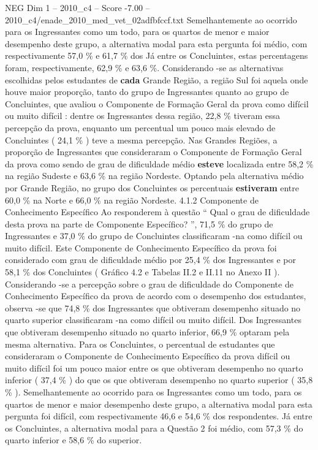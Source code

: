 \begin{textsample}{NEG Dim 1 – 2010\_c4 – Score -7.00 – 2010\_c4/enade\_2010\_med\_vet\_02adfbfccf.txt}
Semelhantemente ao ocorrido para os Ingressantes como um todo, para os quartos de menor e maior desempenho deste grupo, a alternativa modal para esta pergunta foi médio, com respectivamente 57,0 \% e 61,7 \% dos Já entre os Concluintes, estas percentagens foram, respectivamente, 62,9 \% e 63,6 \%.
Considerando -se as alternativas escolhidas pelos estudantes de \textbf{cada} Grande Região, a região Sul foi aquela onde houve maior proporção, tanto do grupo de Ingressantes quanto ao grupo de Concluintes, que avaliou o Componente de Formação Geral da prova como difícil ou muito difícil : dentre os Ingressantes dessa região, 22,8 \% tiveram essa percepção da prova, enquanto um percentual um pouco mais elevado de Concluintes ( 24,1 \% ) teve a mesma percepção.
Nas Grandes Regiões, a proporção de Ingressantes que consideraram o Componente de Formação Geral da prova como sendo de grau de dificuldade médio \textbf{esteve} localizada entre 58,2 \% na região Sudeste e 63,6 \% na região Nordeste.
Optando pela alternativa médio por Grande Região, no grupo dos Concluintes os percentuais \textbf{estiveram} entre 60,0 \% na Norte e 66,0 \% na região Nordeste. 4.1.2 Componente de Conhecimento Específico Ao responderem à questão “ Qual o grau de dificuldade desta prova na parte de Componente Específico? ”, 71,5 \% do grupo de Ingressantes e 37,0 \% do grupo de Concluintes classificaram -na como difícil ou muito difícil.
Este Componente de Conhecimento Específico da prova foi considerado com grau de dificuldade médio por 25,4 \% dos Ingressantes e por 58,1 \% dos Concluintes ( Gráfico 4.2 e Tabelas II.2 e II.11 no Anexo II ).
Considerando -se a percepção sobre o grau de dificuldade do Componente de Conhecimento Específico da prova de acordo com o desempenho dos estudantes, observa -se que 74,8 \% dos Ingressantes que obtiveram desempenho situado no quarto superior classificaram -na como difícil ou muito difícil.
Dos Ingressantes que obtiveram desempenho situado no quarto inferior, 66,9 \% optaram pela mesma alternativa.
Para os Concluintes, o percentual de estudantes que consideraram o Componente de Conhecimento Específico da prova difícil ou muito difícil foi um pouco maior entre os que obtiveram desempenho no quarto inferior ( 37,4 \% ) do que os que obtiveram desempenho no quarto superior ( 35,8 \% ).
Semelhantemente ao ocorrido para os Ingressantes como um todo, para os quartos de menor e maior desempenho deste grupo, a alternativa modal para esta pergunta foi difícil, com respectivamente 46,6 e 54,6 \% dos respondentes.
Já entre os Concluintes, a alternativa modal para a Questão 2 foi médio, com 57,3 \% do quarto inferior e 58,6 \% do superior.

\end{textsample}
